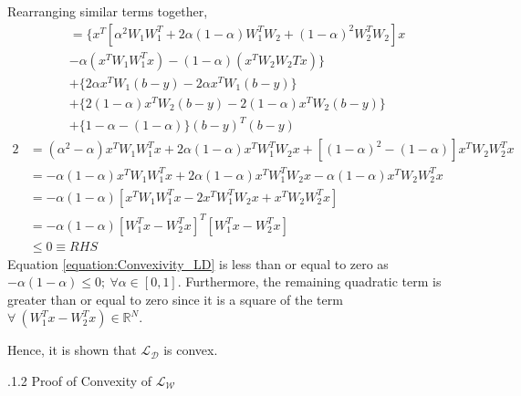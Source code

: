 \documentclass[a4paper,12pt]{article}
\begin{document}
Rearranging similar terms together,
\begin{multline}
	= \{ x^{T} \left[ \alpha^2 W_1 W_1^{T} + 2 \alpha (1 - \alpha) W_1^{T} W_2
    	+ (1 - \alpha)^2 W_2^{T} W_2 \right] x \\ 
        - \alpha (x^{T} W_1 W_1^{T} x) - (1 - \alpha)(x^{T} W_2 W_2{T} x) \} \\
        + \{ 2 \alpha x^{T} W_1 (b - y) - 2 \alpha x^{T} W_1 (b - y) \} \\
        + \{ 2 (1 - \alpha) x^{T} W_2 (b - y) - 2 (1 - \alpha) x^{T} W_2 (b - y) \} \\
        + \{ 1 - \alpha - (1 - \alpha) \} (b - y)^{T} (b - y)
\end{multline}
\begin{alignat}{2}
	&= (\alpha^2 - \alpha) x^{T} W_1 W_1^{T} x + 2 \alpha (1 - \alpha) x^{T} W_1^{T} W_2 x
    	+ [(1 - \alpha)^2 - (1 - \alpha)] x^{T} W_2 W_2^{T} x \\
    &= - \alpha (1 - \alpha) x^{T} W_1 W_1^{T} x + 2 \alpha (1 - \alpha) x^{T} W_1^{T} W_2 x
    	- \alpha (1 - \alpha) x^{T} W_2 W_2^{T} x \\
    &= - \alpha (1 - \alpha) [ x^{T} W_1 W_1^{T} x - 2 x^{T} W_1^{T} W_2 x + 
        x^{T} W_2 W_2^{T} x ] \\
    \label{equation:Convexivity_LD} &= - \alpha (1 - \alpha) [W_1^{T} x - W_2^{T} x]^{T} [W_1^{T} x - W_2^{T} x] \\
    &\leq 0 \equiv RHS
\end{alignat}
Equation \ref{equation:Convexivity_LD} is less than or equal to zero as $-\alpha (1 - \alpha) \leq 0 ;\ \forall \alpha \in [0, 1]$. Furthermore, the remaining quadratic term is greater than or equal to zero since it is a square of the term $\forall \ \left( W_1^{T} x - W_2^{T} x \right) \in \mathbb{R}^N$. 

Hence, it is shown that $\mathcal{L_D}$ is convex.
\vspace{1em}

.1.2 Proof of Convexity of $\mathcal{L_W}$
\end{document}
